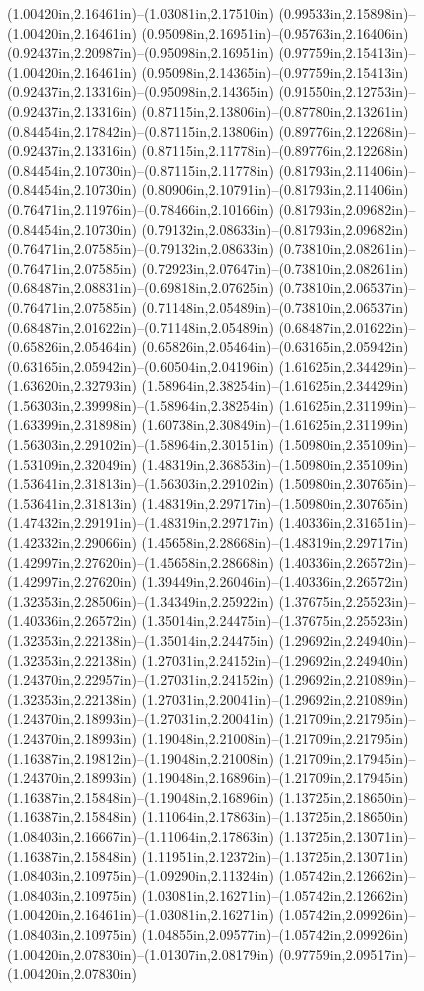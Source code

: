 (1.00420in,2.16461in)--(1.03081in,2.17510in) (0.99533in,2.15898in)--(1.00420in,2.16461in) (0.95098in,2.16951in)--(0.95763in,2.16406in) (0.92437in,2.20987in)--(0.95098in,2.16951in) (0.97759in,2.15413in)--(1.00420in,2.16461in) (0.95098in,2.14365in)--(0.97759in,2.15413in) (0.92437in,2.13316in)--(0.95098in,2.14365in) (0.91550in,2.12753in)--(0.92437in,2.13316in) (0.87115in,2.13806in)--(0.87780in,2.13261in) (0.84454in,2.17842in)--(0.87115in,2.13806in) (0.89776in,2.12268in)--(0.92437in,2.13316in) (0.87115in,2.11778in)--(0.89776in,2.12268in) (0.84454in,2.10730in)--(0.87115in,2.11778in) (0.81793in,2.11406in)--(0.84454in,2.10730in) (0.80906in,2.10791in)--(0.81793in,2.11406in) (0.76471in,2.11976in)--(0.78466in,2.10166in) (0.81793in,2.09682in)--(0.84454in,2.10730in) (0.79132in,2.08633in)--(0.81793in,2.09682in) (0.76471in,2.07585in)--(0.79132in,2.08633in) (0.73810in,2.08261in)--(0.76471in,2.07585in) (0.72923in,2.07647in)--(0.73810in,2.08261in) (0.68487in,2.08831in)--(0.69818in,2.07625in) (0.73810in,2.06537in)--(0.76471in,2.07585in) (0.71148in,2.05489in)--(0.73810in,2.06537in) (0.68487in,2.01622in)--(0.71148in,2.05489in) (0.68487in,2.01622in)--(0.65826in,2.05464in) (0.65826in,2.05464in)--(0.63165in,2.05942in) (0.63165in,2.05942in)--(0.60504in,2.04196in) (1.61625in,2.34429in)--(1.63620in,2.32793in) (1.58964in,2.38254in)--(1.61625in,2.34429in) (1.56303in,2.39998in)--(1.58964in,2.38254in) (1.61625in,2.31199in)--(1.63399in,2.31898in) (1.60738in,2.30849in)--(1.61625in,2.31199in) (1.56303in,2.29102in)--(1.58964in,2.30151in) (1.50980in,2.35109in)--(1.53109in,2.32049in) (1.48319in,2.36853in)--(1.50980in,2.35109in) (1.53641in,2.31813in)--(1.56303in,2.29102in) (1.50980in,2.30765in)--(1.53641in,2.31813in) (1.48319in,2.29717in)--(1.50980in,2.30765in) (1.47432in,2.29191in)--(1.48319in,2.29717in) (1.40336in,2.31651in)--(1.42332in,2.29066in) (1.45658in,2.28668in)--(1.48319in,2.29717in) (1.42997in,2.27620in)--(1.45658in,2.28668in) (1.40336in,2.26572in)--(1.42997in,2.27620in) (1.39449in,2.26046in)--(1.40336in,2.26572in) (1.32353in,2.28506in)--(1.34349in,2.25922in) (1.37675in,2.25523in)--(1.40336in,2.26572in) (1.35014in,2.24475in)--(1.37675in,2.25523in) (1.32353in,2.22138in)--(1.35014in,2.24475in) (1.29692in,2.24940in)--(1.32353in,2.22138in) (1.27031in,2.24152in)--(1.29692in,2.24940in) (1.24370in,2.22957in)--(1.27031in,2.24152in) (1.29692in,2.21089in)--(1.32353in,2.22138in) (1.27031in,2.20041in)--(1.29692in,2.21089in) (1.24370in,2.18993in)--(1.27031in,2.20041in) (1.21709in,2.21795in)--(1.24370in,2.18993in) (1.19048in,2.21008in)--(1.21709in,2.21795in) (1.16387in,2.19812in)--(1.19048in,2.21008in) (1.21709in,2.17945in)--(1.24370in,2.18993in) (1.19048in,2.16896in)--(1.21709in,2.17945in) (1.16387in,2.15848in)--(1.19048in,2.16896in) (1.13725in,2.18650in)--(1.16387in,2.15848in) (1.11064in,2.17863in)--(1.13725in,2.18650in) (1.08403in,2.16667in)--(1.11064in,2.17863in) (1.13725in,2.13071in)--(1.16387in,2.15848in) (1.11951in,2.12372in)--(1.13725in,2.13071in) (1.08403in,2.10975in)--(1.09290in,2.11324in) (1.05742in,2.12662in)--(1.08403in,2.10975in) (1.03081in,2.16271in)--(1.05742in,2.12662in) (1.00420in,2.16461in)--(1.03081in,2.16271in) (1.05742in,2.09926in)--(1.08403in,2.10975in) (1.04855in,2.09577in)--(1.05742in,2.09926in) (1.00420in,2.07830in)--(1.01307in,2.08179in) (0.97759in,2.09517in)--(1.00420in,2.07830in) 